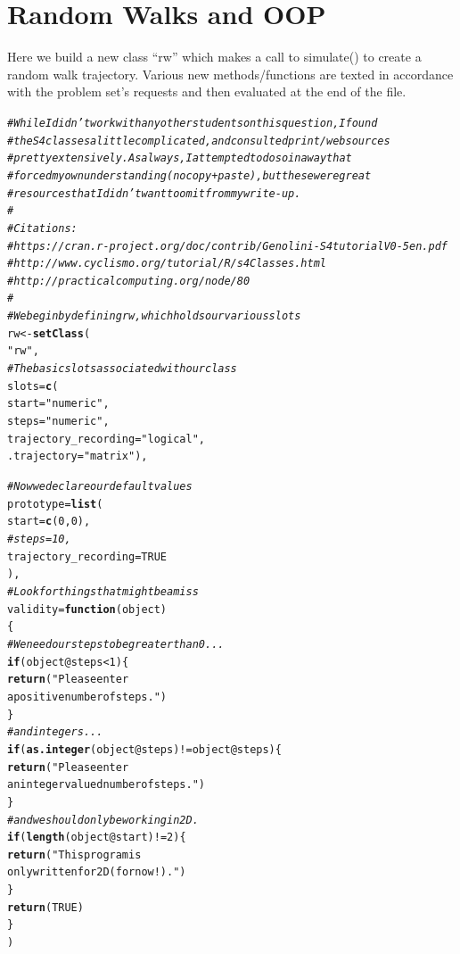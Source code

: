 \documentclass{article}\usepackage[]{graphicx}\usepackage[]{color}
\makeatletter
\newcommand{\hlnum}[1]{\textcolor[rgb]{0.686,0.059,0.569}{#1}}%
\newcommand{\hlstr}[1]{\textcolor[rgb]{0.192,0.494,0.8}{#1}}%
\newcommand{\hlcom}[1]{\textcolor[rgb]{0.678,0.584,0.686}{\textit{#1}}}%
\newcommand{\hlopt}[1]{\textcolor[rgb]{0,0,0}{#1}}%
\newcommand{\hlstd}[1]{\textcolor[rgb]{0.345,0.345,0.345}{#1}}%
\newcommand{\hlkwa}[1]{\textcolor[rgb]{0.161,0.373,0.58}{\textbf{#1}}}%
\newcommand{\hlkwb}[1]{\textcolor[rgb]{0.69,0.353,0.396}{#1}}%
\newcommand{\hlkwc}[1]{\textcolor[rgb]{0.333,0.667,0.333}{#1}}%
\newcommand{\hlkwd}[1]{\textcolor[rgb]{0.737,0.353,0.396}{\textbf{#1}}}%
\newenvironment{kframe}{%
 \def\at@end@of@kframe{}%
 \ifinner\ifhmode%
  \def\at@end@of@kframe{\end{minipage}}%
  \begin{minipage}{\columnwidth}%
 \fi\fi%
 \def\FrameCommand##1{\hskip\@totalleftmargin \hskip-\fboxsep
 \colorbox{shadecolor}{##1}\hskip-\fboxsep
     \hskip-\linewidth \hskip-\@totalleftmargin \hskip\columnwidth}%
 \MakeFramed {\advance\hsize-\width
   \@totalleftmargin\z@ \linewidth\hsize
   \@setminipage}}%
 {\par\unskip\endMakeFramed%
 \at@end@of@kframe}
\newenvironment{knitrout}{}{} %
\makeatother
\begin{document}
\section{Random Walks and OOP}

Here we build a new class ``rw'' which makes a call to simulate() to create a random walk trajectory.  Various new methods/functions are texted in accordance with the problem set's requests and then evaluated at the end of the file.

\begin{knitrout}
\color{fgcolor}\begin{kframe}
\begin{alltt}
\hlcom{# While I didn't work with any other students on this question, I found}
\hlcom{# the S4 classes a little complicated, and consulted print/web sources}
\hlcom{# pretty extensively.  As always, I attempted to do so in a way that }
\hlcom{# forced my own understanding (no copy + paste), but these were great}
\hlcom{# resources that I didn't want to omit from my write-up.}
\hlcom{#}
\hlcom{# Citations: }
\hlcom{# https://cran.r-project.org/doc/contrib/Genolini-S4tutorialV0-5en.pdf}
\hlcom{# http://www.cyclismo.org/tutorial/R/s4Classes.html}
\hlcom{# http://practicalcomputing.org/node/80}
\hlcom{#}
\hlcom{# We begin by defining rw, which holds our various slots}
\hlstd{rw} \hlkwb{<-} \hlkwd{setClass}\hlstd{(}
  \hlstr{"rw"}\hlstd{,}
  \hlcom{# The basic slots associated with our class}
  \hlkwc{slots} \hlstd{=} \hlkwd{c}\hlstd{(}
    \hlkwc{start} \hlstd{=} \hlstr{"numeric"}\hlstd{,}
    \hlkwc{steps}   \hlstd{=} \hlstr{"numeric"}\hlstd{,}
    \hlkwc{trajectory_recording} \hlstd{=} \hlstr{"logical"}\hlstd{,}
    \hlkwc{.trajectory} \hlstd{=} \hlstr{"matrix"}\hlstd{),}

  \hlcom{# Now we declare our default values}
  \hlkwc{prototype}\hlstd{=}\hlkwd{list}\hlstd{(}
    \hlkwc{start} \hlstd{=} \hlkwd{c}\hlstd{(}\hlnum{0}\hlstd{,}\hlnum{0}\hlstd{),}
    \hlcom{#steps = 10,}
    \hlkwc{trajectory_recording} \hlstd{=} \hlnum{TRUE}
  \hlstd{),}
  \hlcom{# Look for things that might be amiss}
  \hlkwc{validity}\hlstd{=}\hlkwa{function}\hlstd{(}\hlkwc{object}\hlstd{)}
  \hlstd{\{}
    \hlcom{# We need our steps to be greater than 0...}
    \hlkwa{if}\hlstd{(object}\hlopt{@}\hlkwc{steps}\hlopt{<}\hlnum{1}\hlstd{) \{}
      \hlkwd{return}\hlstd{(}\hlstr{"Please enter 
             a positive number of steps."}\hlstd{)}
    \hlstd{\}}
    \hlcom{# and integers...}
    \hlkwa{if}\hlstd{(}\hlkwd{as.integer}\hlstd{(object}\hlopt{@}\hlkwc{steps}\hlstd{)}\hlopt{!=}\hlstd{object}\hlopt{@}\hlkwc{steps}\hlstd{) \{}
      \hlkwd{return}\hlstd{(}\hlstr{"Please enter 
             an integer valued number of steps."}\hlstd{)}
    \hlstd{\}}
    \hlcom{# and we should only be working in 2D.}
    \hlkwa{if}\hlstd{(}\hlkwd{length}\hlstd{(object}\hlopt{@}\hlkwc{start}\hlstd{)}\hlopt{!=}\hlnum{2}\hlstd{) \{}
      \hlkwd{return}\hlstd{(}\hlstr{"This program is
             only written for 2D (for now!)."}\hlstd{)}
    \hlstd{\}}
    \hlkwd{return}\hlstd{(}\hlnum{TRUE}\hlstd{)}
  \hlstd{\}}
\hlstd{)}


\end{alltt}
\end{kframe}
\end{knitrout}
\end{document}

